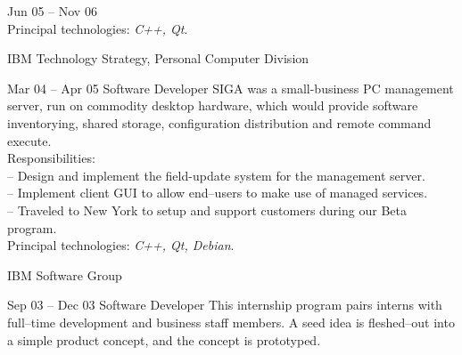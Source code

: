 \documentclass[letterpaper, 11pt]{article}
\begin{document}
\begin{resume}
\begin{block}
\begin{subcategory}{Jun 05 -- Nov 06}
                \\[1ex]
                Principal technologies: \emph{C++, Qt}.
                \bigskip
                \bigskip
            \end{subcategory}
        \end{block}
        \begin{block}
            \begin{category}{IBM}
                 {Technology Strategy, Personal Computer Division}
                \smallskip
            \end{category}
            \begin{subcategory}{Mar 04 -- Apr 05}
                 {Software Developer}
                SIGA was a small-business PC management server, run on commodity desktop
                hardware, which would provide software inventorying, shared storage,
                configuration distribution and remote command execute.
                \\[1ex]
                Responsibilities: \\
                -- Design and implement the field-update system for the management server. \\
                -- Implement client GUI to allow end--users to make use of managed services. \\
                -- Traveled to New York to setup and support customers during our Beta program.
                \\[1ex]
                Principal technologies: \emph{C++, Qt, Debian}.
                \bigskip
                \bigskip
            \end{subcategory}
        \end{block}
        \begin{block}
            \begin{category}{IBM}
                 {Software Group}
                \smallskip
            \end{category}
            \begin{subcategory}{Sep 03 -- Dec 03}
                 {Software Developer}
                This internship program pairs interns with full--time development and
                business staff members.  A seed idea is fleshed--out into a simple
                product concept, and the concept is prototyped.
                \\[1ex]

\end{subcategory}
\end{block}
\end{resume}
\end{document}
